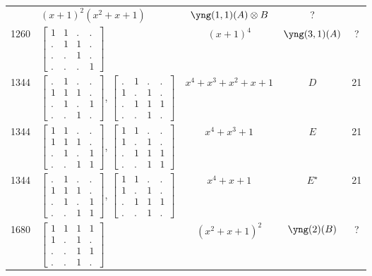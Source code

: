 \documentclass[11pt,oneside]{article}
\newcommand{\tensor}{\otimes}
\begin{document}
\begin{center}
\begin{tabular}{r|l|c|c|c}
  & $(x+1)^2(x^2+x+1)$  & $\yng(1,1)(A)\tensor B$ & ?  \\
1260  & $\begin{bmatrix}1&1&.&.\\.&1&1&.\\.&.&1&.\\.&.&.&1\end{bmatrix}$  & $(x+1)^4$  & $\yng(3,1)(A)$ & ?  \\
1344  & 
$\begin{bmatrix}.&1&.&.\\1&1&1&.\\.&1&.&1\\.&.&1&.\end{bmatrix}$,
$\begin{bmatrix}.&1&.&.\\1&.&1&.\\.&1&1&1\\.&.&1&.\end{bmatrix}$
& $x^4+x^3+x^2+x+1$  & $D$ & 21  \\
1344  & 
$\begin{bmatrix}1&1&.&.\\1&1&1&.\\.&1&.&1\\.&.&1&1\end{bmatrix}$,
$\begin{bmatrix}1&1&.&.\\1&.&1&.\\.&1&1&1\\.&.&1&1\end{bmatrix}$
& $x^4+x^3+1$        & $E$ & 21  \\
1344  & 
$\begin{bmatrix}.&1&.&.\\1&1&1&.\\.&1&.&1\\.&.&1&1\end{bmatrix}$,
$\begin{bmatrix}1&1&.&.\\1&.&1&.\\.&1&1&1\\.&.&1&.\end{bmatrix}$
& $x^4+x+1$          & $E^\star$ & 21  \\
1680  & $\begin{bmatrix}1&1&1&1\\1&.&1&.\\.&.&1&1\\.&.&1&.\end{bmatrix}$  & $(x^2+x+1)^2$  & $\yng(2)(B)$ & ?  \\

\end{tabular}
\end{center}
\end{document}
